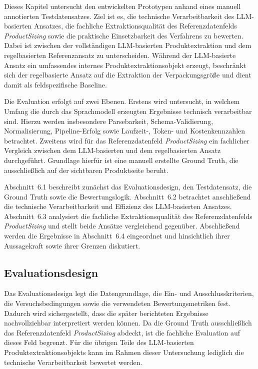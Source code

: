Dieses Kapitel untersucht den entwickelten Prototypen anhand eines manuell annotierten Testdatensatzes. Ziel ist es, die technische Verarbeitbarkeit des LLM-basierten Ansatzes, die fachliche Extraktionsqualität des Referenzdatenfelds \textit{ProductSizing} sowie die praktische Einsetzbarkeit des Verfahrens zu bewerten. Dabei ist zwischen der vollständigen LLM-basierten Produktextraktion und dem regelbasierten Referenzansatz zu unterscheiden. Während der LLM-basierte Ansatz ein umfassendes internes Produktextraktionsobjekt erzeugt, beschränkt sich der regelbasierte Ansatz auf die Extraktion der Verpackungsgröße und dient damit als feldspezifische Baseline.

Die Evaluation erfolgt auf zwei Ebenen. Erstens wird untersucht, in welchem Umfang die durch das Sprachmodell erzeugten Ergebnisse technisch verarbeitbar sind. Hierzu werden insbesondere Parsebarkeit, Schema-Validierung, Normalisierung, Pipeline-Erfolg sowie Laufzeit-, Token- und Kostenkennzahlen betrachtet. Zweitens wird für das Referenzdatenfeld \textit{ProductSizing} ein fachlicher Vergleich zwischen dem LLM-basierten und dem regelbasierten Ansatz durchgeführt. Grundlage hierfür ist eine manuell erstellte Ground Truth, die ausschließlich auf der sichtbaren Produktseite beruht.

Abschnitt~6.1 beschreibt zunächst das Evaluationsdesign, den Testdatensatz, die Ground Truth sowie die Bewertungslogik. Abschnitt~6.2 betrachtet anschließend die technische Verarbeitbarkeit und Effizienz des LLM-basierten Ansatzes. Abschnitt~6.3 analysiert die fachliche Extraktionsqualität des Referenzdatenfelds \textit{ProductSizing} und stellt beide Ansätze vergleichend gegenüber. Abschließend werden die Ergebnisse in Abschnitt~6.4 eingeordnet und hinsichtlich ihrer Aussagekraft sowie ihrer Grenzen diskutiert.

\subsection{Evaluationsdesign}

Das Evaluationsdesign legt die Datengrundlage, die Ein- und Ausschlusskriterien, die Versuchsbedingungen sowie die verwendeten Bewertungsmetriken fest. Dadurch wird sichergestellt, dass die später berichteten Ergebnisse nachvollziehbar interpretiert werden können. Da die Ground Truth ausschließlich das Referenzdatenfeld \textit{ProductSizing} abdeckt, ist die fachliche Evaluation auf dieses Feld begrenzt. Für die übrigen Teile des LLM-basierten Produktextraktionsobjekts kann im Rahmen dieser Untersuchung lediglich die technische Verarbeitbarkeit bewertet werden.


